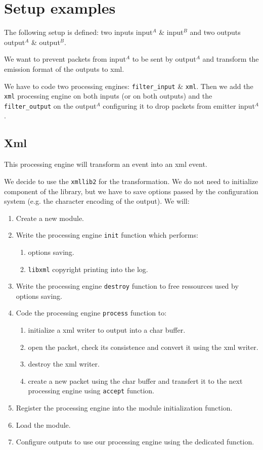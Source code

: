 %
%
\section{Setup examples}

The following setup is defined: two inputs input$^A$ \& input$^B$
and two outputs output$^A$ \& output$^B$.

We want to prevent packets from input$^A$ to be sent by output$^A$ and
transform the emission format of the outputs to xml.

We have to code two processing engines: \texttt{filter\_input} \& \texttt{xml}.
Then we add the \texttt{xml} processing engine on both inputs (or on both
outputs) and the \texttt{filter\_output} on the output$^A$ configuring it
to drop packets from emitter input$^A$.

%
%
\subsection{Xml}

This processing engine will transform an event into an xml event.

We decide to use the \texttt{xmllib2} for the transformation. We do not need
to initialize component of the library, but we have to save options passed by
the configuration system (e.g. the character encoding of the output).
We will:

\begin{enumerate}
\item Create a new module.
\item Write the processing engine \texttt{init} function which performs:
\begin{enumerate}
\item options saving.
\item \texttt{libxml} copyright printing into the log.
\end{enumerate}
\item Write the processing engine \texttt{destroy} function to free ressources
used by options saving.
\item Code the processing engine \texttt{process} function to:
\begin{enumerate}
\item initialize a xml writer to output into a char buffer.
\item open the packet, check its consistence and convert it using the 
xml writer.
\item destroy the xml writer.
\item create a new packet using the char buffer and transfert it to
the next processing engine using \texttt{accept} function.
\end{enumerate}
\item Register the processing engine into the module initialization function.
\item Load the module.
\item Configure outputs to use our processing engine using the dedicated 
function.
\end{enumerate}

